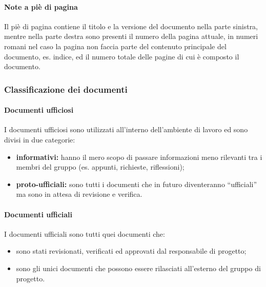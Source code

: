 			\paragraph{Note a piè di pagina}
				Il piè di pagina contiene il titolo e la versione del documento nella parte sinistra, mentre nella parte destra sono presenti il numero della pagina attuale, in numeri romani nel caso la pagina non faccia parte del contenuto principale del documento, es. indice, ed il numero totale delle pagine di cui è composto il documento.
		\subsubsection{Classificazione dei documenti}
			\paragraph{Documenti ufficiosi}
				I documenti ufficiosi sono utilizzati all'interno dell'ambiente di lavoro ed sono divisi in due categorie:
				\begin{itemize}
					\item \textbf{informativi:} hanno il mero scopo di passare informazioni meno rilevanti tra i membri del gruppo (es. appunti, richieste, riflessioni);
					\item \textbf{proto-ufficiali:} sono tutti i documenti che in futuro diventeranno ``ufficiali'' ma sono in attesa di revisione e verifica.
				\end{itemize}
			\paragraph{Documenti ufficiali}
				I documenti ufficiali sono tutti quei documenti che:
				\begin{itemize}
					\item sono stati revisionati, verificati ed approvati dal responsabile di progetto;
					\item sono gli unici documenti che possono essere rilasciati all'esterno del gruppo di progetto.
				\end{itemize}
